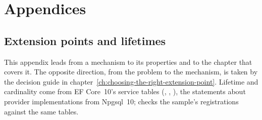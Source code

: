 \part{Appendices}\label{part:X}

\appendix

\chapter{Extension points and lifetimes}\label{app:A}

This appendix leads from a mechanism to its properties and to the chapter that covers it. The
opposite direction, from the problem to the mechanism, is taken by the decision guide in
chapter~\ref{ch:choosing-the-right-extension-point}. Lifetime and cardinality come from
EF Core~10's service tables
(,
,
),
the statements about provider implementations from Npgsql~10;
 checks the sample's registrations
against the same tables.

